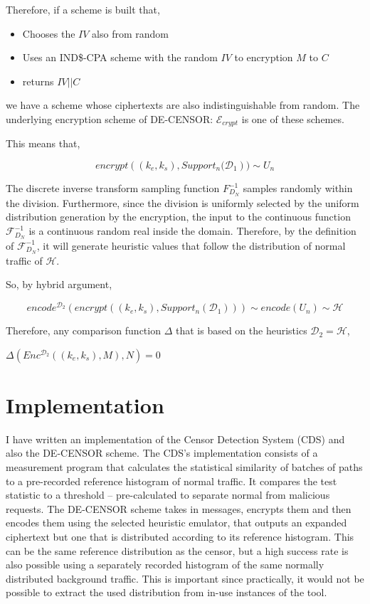 \documentclass[ %
                    author={Samuel Russell},
                supervisor={Prof. Bogdan Warinschi},
                    degree={MEng},
                     title={Innocuous Ciphertexts},
                  subtitle={The DE-CENSOR Scheme},
                      type={Research},
                      year={2018} ]{dissertation}
\begin{document}
Therefore, if a scheme is built that,
\begin{itemize}
\item Chooses the $IV$ also from random
\item Uses an IND\$-CPA scheme with the random $IV$ to encryption $M$ to $C$
\item returns $IV || C$
\end{itemize}

we have a scheme whose ciphertexts are also indistinguishable from random.
The underlying encryption scheme of DE-CENSOR: $\mathcal{E}_{crypt}$ is one of these schemes.

This means that,

$$ encrypt \left( (k_e, k_s), Support_n(\mathcal{D}_1 \right) ) \sim  U_n$$

The discrete inverse transform sampling function $F^{-1}_{D_N}$ samples randomly within the division.
Furthermore, since the division is uniformly selected by the uniform distribution generation by the encryption, the input to the continuous function $\mathcal{F}^{-1}_{D_N}$ is a continuous random real inside the domain.
Therefore, by the definition of $\mathcal{F}^{-1}_{D_N}$, it will generate heuristic values that follow the distribution of normal traffic of $\mathcal{H}$.

So, by hybrid argument,

$$ encode^{\mathcal{D}_2} \left( encrypt \left( (k_e, k_s), Support_n(\mathcal{D}_1) \right) \right) \sim  encode \left( U_n \right) \sim \mathcal{H}$$

Therefore, any comparison function $\Delta$ that is based on the heuristics $\mathcal{D}_2 = \mathcal{H}$,

$\Delta \left(  Enc^{\mathcal{D}_2}((k_e,k_s), M), N  \right) = 0$

\chapter{Implementation}

I have written an implementation of the Censor Detection System (CDS) and also the DE-CENSOR scheme.
The CDS's implementation consists of a measurement program that calculates the statistical similarity of batches of paths to a pre-recorded reference histogram of normal traffic.
It compares the test statistic to a threshold -- pre-calculated to separate normal from malicious requests.
The DE-CENSOR scheme takes in messages, encrypts them and then encodes them using the selected heuristic emulator, that outputs an expanded ciphertext but one that is distributed according to its reference histogram. This can be the same reference distribution as the censor, but a high success rate is also possible using a separately recorded histogram of the same normally distributed background traffic.
This is important since practically, it would not be possible to extract the used distribution from in-use instances of the tool.
\end{document}
